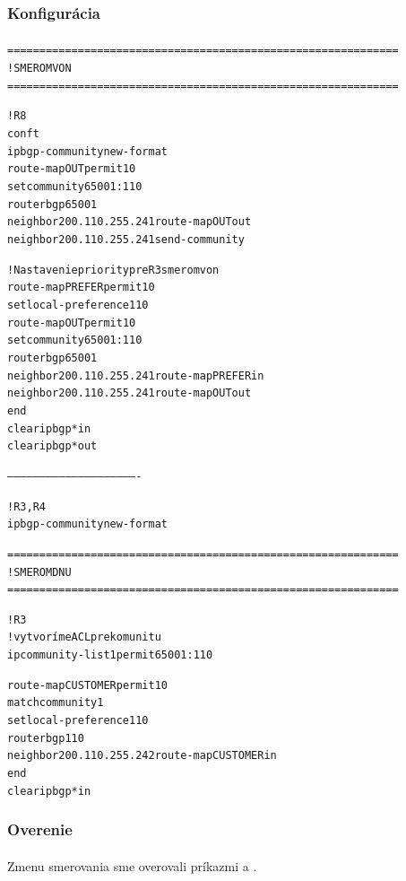 \documentclass[12pt,twoside,a4paper]{report}
\begin{document}
\newpage

\subsubsection{Konfigurácia}
\paragraph{}

\noindent
{\selectfont
\begin{small}
\begin{alltt}
=============================================================
!SMEROM VON
=============================================================

!R8
conf t
ip bgp-community new-format
route-map OUT permit 10
set community 65001:110
router bgp 65001
neighbor 200.110.255.241 route-map OUT out
neighbor 200.110.255.241 send-community

!Nastavenie priority pre R3 smerom von
route-map PREFER permit 10
  set local-preference 110
route-map OUT permit 10
  set community 65001:110
router bgp 65001
  neighbor 200.110.255.241 route-map PREFER in
  neighbor 200.110.255.241 route-map OUT out
end
clear ip bgp * in
clear ip bgp * out


-------------------------------------------------------------


!R3, R4
ip bgp-community new-format



=============================================================
!SMEROM DNU
=============================================================

!R3
!vytvoríme ACL pre komunitu
ip community-list 1 permit 65001:110

route-map CUSTOMER permit 10
  match community 1
  set local-preference 110
router bgp 110
  neighbor 200.110.255.242 route-map CUSTOMER in
end
clear ip bgp * in
\end{alltt}
\end{small}
}

\subsubsection{Overenie}
\paragraph{}
Zmenu smerovania sme overovali príkazmi  a .
\end{document}
